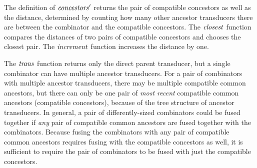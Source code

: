The definition of $\mathit{concestors}'$ returns the pair of compatible concestors as well as the distance, determined by counting how many other ancestor transducers there are between the combinator and the compatible concestors.
The $\mathit{closest}$ function compares the distances of two pairs of compatible concestors and chooses the closest pair.
The $\mathit{increment}$ function increases the distance by one.

The $\mathit{trans}$ function returns only the direct parent transducer, but a single combinator can have multiple ancestor transducers.
For a pair of combinators with multiple ancestor transducers, there may be multiple compatible common ancestors, but there can only be one pair of \emph{most recent} compatible common ancestors (compatible concestors), because of the tree structure of ancestor transducers.
In general, a pair of differently-sized combinators could be fused together if \emph{any} pair of compatible common ancestors are fused together with the combinators.
Because fusing the combinators with any pair of compatible common ancestors requires fusing with the compatible concestors as well, it is sufficient to require the pair of combinators to be fused with just the compatible concestors.




